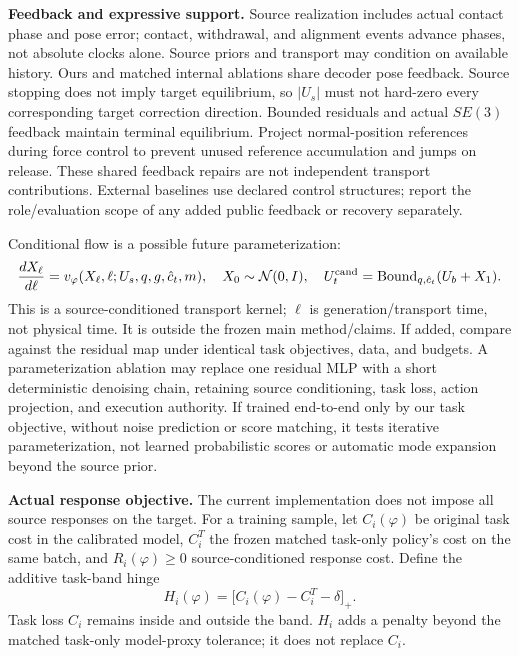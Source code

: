 \documentclass[11pt]{article}
\begin{document}
\textbf{Feedback and expressive support.} Source realization includes actual contact
phase and pose error; contact, withdrawal, and alignment events advance phases, not
absolute clocks alone. Source priors and transport may condition on available history.
Ours and matched internal ablations share decoder pose feedback. Source stopping does
not imply target equilibrium, so $|U_s|$ must not hard-zero every corresponding target
correction direction. Bounded residuals and actual $SE(3)$ feedback maintain terminal
equilibrium. Project normal-position references during force control to prevent unused
reference accumulation and jumps on release. These shared feedback repairs are not
independent transport contributions. External baselines use declared control structures;
report the role/evaluation scope of any added public feedback or recovery separately.

Conditional flow is a possible future parameterization:
\begin{equation}
 \frac{dX_\ell}{d\ell}=v_\varphi(X_\ell,\ell;U_s,q,g,\hat c_t,m),
\quad X_0\sim\mathcal N(0,I),\quad
U_t^{\rm cand}=\operatorname{Bound}_{q,\hat c_t}(U_b+X_1).
 \label{eq:flow}
\end{equation}
This is a source-conditioned transport kernel; $\ell$ is generation/transport time,
not physical time. It is outside the frozen main method/claims. If added, compare
against the residual map under identical task objectives, data, and budgets. A
parameterization ablation may replace one residual MLP with a short deterministic
denoising chain, retaining source conditioning, task loss, action projection, and
execution authority. If trained end-to-end only by our task objective, without noise
prediction or score matching, it tests iterative parameterization, not learned
probabilistic scores or automatic mode expansion beyond the source prior.

\textbf{Actual response objective.} The current implementation does not impose all
source responses on the target. For a training sample, let $C_i(\varphi)$ be original
task cost in the calibrated model, $C_i^T$ the frozen matched task-only policy's cost
on the same batch, and $R_i(\varphi)\geq0$ source-conditioned response cost.
Define the additive task-band hinge
\begin{equation}
 H_i(\varphi)=\big[C_i(\varphi)-C_i^T-\delta\big]_+ .
 \label{eq:additive-band}
\end{equation}
Task loss $C_i$ remains inside and outside the band. $H_i$ adds a penalty beyond the
matched task-only model-proxy tolerance; it does not replace $C_i$.
\end{document}
